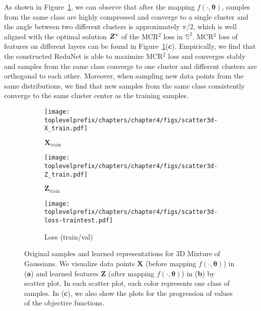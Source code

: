 \documentclass[../../book-main.tex]{subfiles}
\begin{document}
\begin{example}
As shown in Figure~\ref{fig:redu-3d-gaussian-diagram}, we can observe that after the mapping $f(\cdot, \bm{\theta})$, samples from the same class are highly compressed and converge to a single cluster and the angle between two different clusters is approximately $\pi/2$, which is well aligned with the optimal solution $\bm{Z}^{\star}$ of the MCR$^2$ loss in $\mathbb{S}^2$. 
MCR$^2$ loss of features on different layers can be found in Figure~\ref{fig:redu-3d-gaussian-diagram}(\textbf{c}). Empirically, we find that the constructed ReduNet is able to maximize MCR$^2$ loss and converges stably and samples from the same class converge to one cluster and different clusters are orthogonal to each other. 
Moreover, when sampling new data points from the same distributions, we find that new samples from the same class consistently converge to the same cluster center as the training samples. 
\begin{figure}[t]
    \begin{subfigure}[t]{0.32\textwidth}
        \centering 
        \texttt{[image: \\toplevelprefix/chapters/chapter4/figs/scatter3d-X\_train.pdf]}\vspace{-0.1in}
        \caption{$\bm{X}_{\text{train}}$}
    \end{subfigure}
    \hfill
    \begin{subfigure}[t]{0.32\textwidth}
        \centering 
        \texttt{[image: \\toplevelprefix/chapters/chapter4/figs/scatter3d-Z\_train.pdf]}\vspace{-0.1in}
        \caption{$\bm{Z}_{\text{train}}$}
    \end{subfigure}
    \hfill
    \begin{subfigure}[t]{0.32\textwidth}
        \centering 
        \texttt{[image: \\toplevelprefix/chapters/chapter4/figs/scatter3d-loss-traintest.pdf]}\vspace{-0.1in}
        \caption{Loss (train/val)}
    \end{subfigure}
    \vspace{-0.1in}
    \caption{\small Original samples  and learned representations for 3D Mixture of Gaussians. We visualize data points $\bm{X}$ (before mapping $f(\cdot, \bm{\theta})$) in (\textbf{a}) and learned features $\bm{Z}$ (after mapping $f(\cdot, \bm{\theta})$) in (\textbf{b}) by scatter plot. In each scatter plot, each color represents one class of samples. In (\textbf{c}), we also show the plots for the progression of values of the objective functions.}
    \label{fig:redu-3d-gaussian-diagram}
\end{figure}

\end{example}
\end{document}
